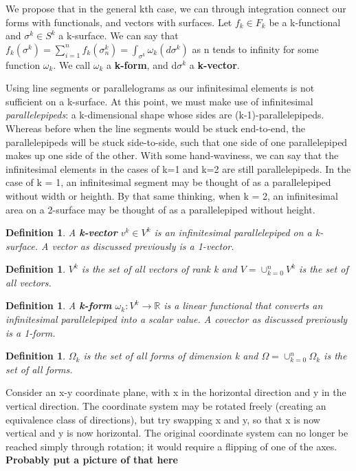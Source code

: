 \documentclass{book}
\newtheorem{defn}[equation]{Definition}
\begin{document}
We propose that in the general kth case, we can through integration connect our forms with functionals, and vectors with surfaces. Let $f_k \in F_k$ be a k-functional and $\sigma^k \in S^k$ a k-surface. We can say that $f_k(\sigma^k) = \sum_{i=1}^n f_k(\sigma^k_n) = \int_{\sigma^k} \omega_k(d\sigma^k)$ as n tends to infinity for some function $\omega_k$. We call $\omega_k$ a \textbf{k-form}, and d$\sigma^k$ a \textbf{k-vector}. 

Using line segments or parallelograms as our infinitesimal elements is not sufficient on a k-surface. At this point, we must make use of infinitesimal \emph{parallelepipeds}: a k-dimensional shape whose sides are (k-1)-parallelepipeds. Whereas before when the line segments would be stuck end-to-end, the parallelepipeds will be stuck side-to-side, such that one side of one parallelepiped makes up one side of the other. With some hand-waviness, we can say that the infinitesimal elements in the cases of k=1 and k=2 are still parallelepipeds. In the case of k = 1, an infinitesimal segment may be thought of as a parallelepiped without width or heighth. By that same thinking, when k = 2, an infinitesimal area on a 2-surface may be thought of as a parallelepiped without height. 


\begin{defn}
	A \textbf{k-vector} $v^k \in V^k$ is an infinitesimal parallelepiped on a k-surface. A vector as discussed previously is a 1-vector. 
\end{defn}


\begin{defn}
	$V^k$ is the set of all vectors of rank k and $V = \cup_{k=0}^n V^k$ is the set of all vectors. 
	\end{defn}
 

\begin{defn}
	A \textbf{k-form} $\omega_k : V^k \to \mathbb{R}$ is a linear functional that converts an infinitesimal parallelepiped into a scalar value. A covector as discussed previously is a 1-form. 
\end{defn}


\begin{defn}
	$\Omega_k$ is the set of all forms of dimension k and $\Omega = \cup_{k=0}^n\Omega_k$ is the set of all forms. 
\end{defn}


Consider an x-y coordinate plane, with x in the horizontal direction and y in the vertical direction. The coordinate system may be rotated freely (creating an equivalence class of directions), but try swapping x and y, so that x is now vertical and y is now horizontal. The original coordinate system can no longer be reached simply through rotation; it would require a flipping of one of the axes. 
\textbf{Probably put a picture of that here}
\end{document}

